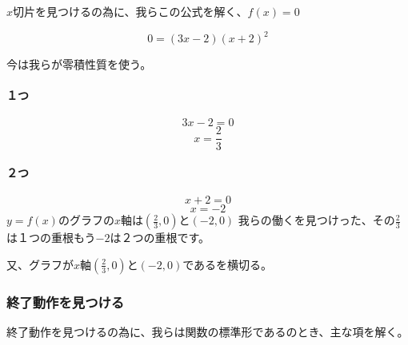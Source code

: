 \documentclass[
]{article}
\begin{document}
{\(x\)}切片を見つけるの為に、我らこの公式を解く、{\(f(x) = 0\)}

\[0 = (3x - 2)(x + 2)^{2}\]

今は我らが零積性質を使う。

\hypertarget{ux3064}{%
\paragraph{１つ}\label{ux3064}}

{\[3x - 2 = 0\]}{\[x = \frac{2}{3}\]}

\hypertarget{ux3064-1}{%
\paragraph{２つ}\label{ux3064-1}}

{\[x + 2 = 0\]}{\[x = - 2\]}{\(y = f(x)\)}のグラフの{\(x\)}軸は{\((\frac{2}{3},0)\)}と{\(( - 2,0)\)}
我らの働くを見つけった、その{\(\frac{2}{3}\)}は１つの重根もう{\(- 2\)}は２つの重根です。

又、グラフが{\(x\)}軸{\((\frac{2}{3},0)\)}と{\(( - 2,0)\)}であるを横切る。

\hypertarget{ux7d42ux4e86ux52d5ux4f5cux3092ux898bux3064ux3051ux308b}{%
\subsubsection{終了動作を見つける}\label{ux7d42ux4e86ux52d5ux4f5cux3092ux898bux3064ux3051ux308b}}

終了動作を見つけるの為に、我らは関数の標準形であるのとき、主な項を解く。
\end{document}
